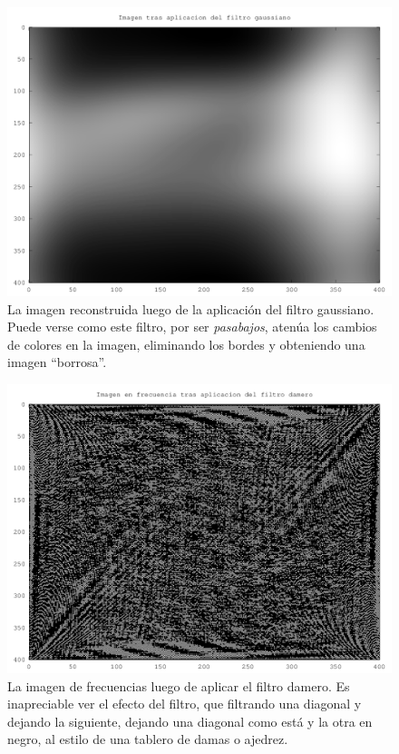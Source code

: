 \documentclass[twocolumn,a4paper,10pt]{article}
\begin{document}
\begin{figure}[H]
        \includegraphics[width=\linewidth]{../images/gaussFilter.png}
        \caption{La imagen reconstruida luego de la aplicaci\'on del filtro gaussiano. Puede verse como este filtro, por ser \textit{pasabajos}, aten\'ua 
        los cambios de colores en la imagen, eliminando los bordes y obteniendo una imagen ``borrosa''.}
        \label{fig:gaussFilter}
\end{figure}

\begin{figure}[H]
        \includegraphics[width=\linewidth]{../images/dameroFilterFreq.png}
        \caption{La imagen de frecuencias luego de aplicar el filtro damero. Es inapreciable ver el efecto del filtro, que filtrando una diagonal y dejando  
        la siguiente, dejando una diagonal como está y la otra en negro, al estilo de una tablero de damas o ajedrez.}
        \label{fig:dameroFilterFrequency}
\end{figure}
\end{document}
